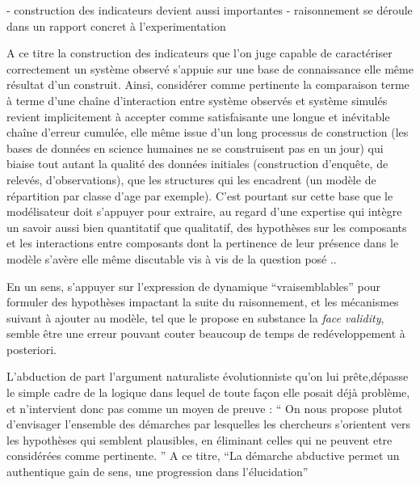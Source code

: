 

 - construction des indicateurs devient aussi importantes
 - raisonnement se déroule dans un rapport concret à l'experimentation




A ce titre la construction des indicateurs que l'on juge capable de caractériser correctement un système observé s'appuie sur une base de connaissance elle même résultat d'un construit. Ainsi, considérer comme pertinente la comparaison terme à terme d'une chaîne d'interaction entre système observés et système simulés  revient implicitement à accepter comme satisfaisante une longue et inévitable chaîne d'erreur cumulée, elle même issue d'un long processus de construction (les bases de données en science humaines ne se construisent pas en un jour) qui biaise tout autant la qualité des données initiales (construction d'enquête, de relevés, d'observations), que les structures qui les encadrent (un modèle de répartition par classe d'age par exemple). C'est pourtant sur cette base que le modélisateur doit s'appuyer pour extraire, au regard d'une expertise qui intègre un savoir aussi bien quantitatif que qualitatif, des hypothèses sur les composants et les interactions entre composants dont la pertinence de leur présence dans le modèle s'avère elle même discutable vis à vis de la question posé ..



En un sens, s'appuyer sur l'expression de dynamique \enquote{vraisemblables} pour formuler des hypothèses impactant la suite du raisonnement, et les mécanismes suivant à ajouter au modèle, tel que le propose en substance la \textit{face validity}, semble être une erreur pouvant couter beaucoup de temps de redéveloppement à posteriori.






L'abduction de part l'argument naturaliste évolutionniste qu'on lui prête,dépasse le simple cadre de la logique dans lequel de toute façon elle posait déjà problème, et n'intervient donc pas comme un moyen de preuve : \enquote{ On nous propose plutot d’envisager l’ensemble des démarches par lesquelles les chercheurs s’orientent vers les hypothèses qui semblent plausibles, en éliminant celles qui ne peuvent etre considérées comme pertinente. } A ce titre, \enquote{La démarche abductive permet un authentique gain de sens, une progression dans l’élucidation}


